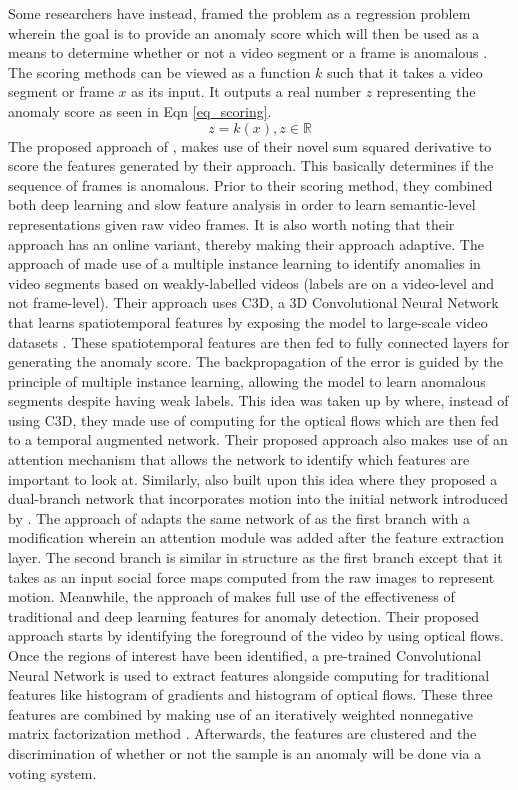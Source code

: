 Some researchers have instead, framed the problem as a regression problem wherein the goal is to provide an anomaly score which will then be used as a means to determine whether or not a video segment or a frame is anomalous . The scoring methods can be viewed as a function $k$ such that it takes a video segment or frame $x$ as its input. It outputs a real number $z$ representing the anomaly score as seen in Eqn \ref{eq_scoring}.
\begin{equation}\label{eq_scoring}
    z = k(x), z \in \mathbb{R}
\end{equation}
The proposed approach of , makes use of their novel sum squared derivative to score the features generated by their approach. This basically determines if the sequence of frames is anomalous. Prior to their scoring method, they combined both deep learning and slow feature analysis  in order to learn semantic-level representations given raw video frames. It is also worth noting that their approach has an online variant, thereby making their approach adaptive.
The approach of  made use of a multiple instance learning to identify anomalies in video segments based on weakly-labelled videos (labels are on a video-level and not frame-level). Their approach uses C3D, a 3D Convolutional Neural Network that learns spatiotemporal features by exposing the model to large-scale video datasets . These spatiotemporal features are then fed to fully connected layers for generating the anomaly score. The backpropagation of the error is guided by the principle of multiple instance learning, allowing the model to learn anomalous segments despite having weak labels. This idea was taken up by  where, instead of using C3D, they made use of computing for the optical flows which are then fed to a temporal augmented network. Their proposed approach also makes use of an attention mechanism  that allows the network to identify which features are important to look at. Similarly,  also built upon this idea where they proposed a dual-branch network that incorporates motion into the initial network introduced by . The approach of  adapts the same network of  as the first branch with a modification wherein an attention module  was added after the feature extraction layer. The second branch is similar in structure as the first branch except that it takes as an input social force maps  computed from the raw images to represent motion. 
Meanwhile, the approach of  makes full use of the effectiveness of traditional and deep learning features for anomaly detection. Their proposed approach starts by identifying the foreground of the video by using optical flows. Once the regions of interest have been identified, a pre-trained Convolutional Neural Network is used to extract features alongside computing for traditional features like histogram of gradients and histogram of optical flows. These three features are combined by making use of an iteratively weighted nonnegative matrix factorization method . Afterwards, the features are clustered and the discrimination of whether or not the sample is an anomaly will be done via a voting system.
